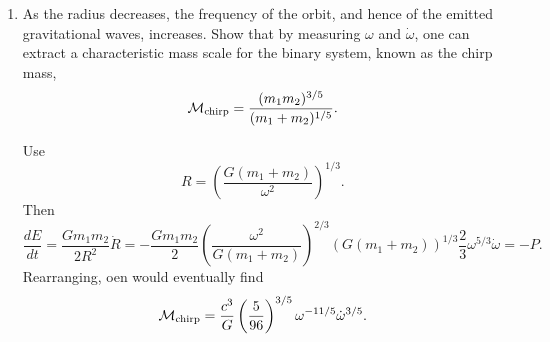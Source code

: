 \begin{enumerate}[label=\roman*)]
\begin{solution}
        We invert the formula for $T=1$ year $\approx 3.15\times 10^7\,\text{s}$:
        \begin{equation}
            R_0 = \left(\frac{256\, G^3 m_1 m_2(m_1+m_2)\,T}{5c^5}\right)^{1/4}.
        \end{equation}
        Using $T/T_{\rm AU} = (R_0/R_{\rm AU})^4$ with $T_{\rm AU} \approx 6\times 10^{12}$ years,
        \begin{equation}
            \frac{R_0}{R_{\rm AU}} = \left(\frac{1\,\text{year}}{6\times 10^{12}\,\text{years}}\right)^{1/4} \approx \frac{1}{1.57\times 10^3},
        \end{equation}
        giving
        \begin{equation}
            R_0 \approx \frac{1.5\times 10^8\,\text{km}}{1.57\times 10^3} \approx 10^5\,\text{km}.
        \end{equation}
        This is smaller than the radius of the Sun ($7\times 10^5\,\text{km}$), but still much larger than the Schwarzschild radius of each black hole ($\sim 90\,\text{km}$), so the linear approximation remains marginally valid.
    \end{solution}
    \item As the radius decreases, the frequency of the orbit, and hence of the emitted gravitational waves, increases. Show that by measuring $\omega$ and $\dot\omega$, one can extract a characteristic mass scale for the binary system, known as the chirp mass,
    \begin{equation}
        \mathcal{M}_{\rm chirp} = \frac{(m_1 m_2)^{3/5}}{(m_1+m_2)^{1/5}}.
    \end{equation}
    \begin{solution}
        Use
        \begin{equation}
            R = \left(\frac{G(m_1+m_2)}{\omega^2}\right)^{1/3}.
        \end{equation}
        Then
        \begin{equation}
            \frac{dE}{dt} = \frac{Gm_1m_2}{2R^2}\dot{R} = -\frac{Gm_1m_2}{2}\left(\frac{\omega^2}{G(m_1+m_2)}\right)^{2/3}\left(G(m_1+m_2)\right)^{1/3}\frac{2}{3}\omega^{5/3}\dot{\omega} =  -P.
        \end{equation}
        Rearranging, oen would eventually find
        \begin{equation}
            \mathcal{M}_{\rm chirp} = \frac{c^3}{G}\left(\frac{5}{96}\right)^{3/5}\omega^{-11/5}\dot\omega^{3/5}.
        \end{equation}
    \end{solution}
\end{enumerate}